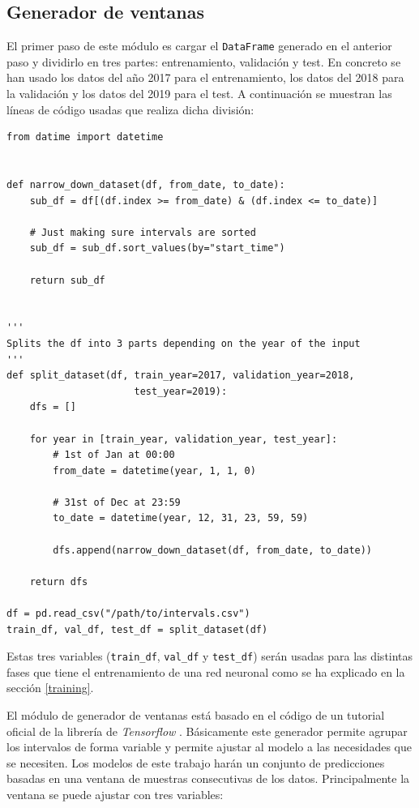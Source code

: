 \subsection{Generador de ventanas}\label{window-generator}

El primer paso de este módulo es cargar el \small{\verb|DataFrame|} generado en el anterior paso y dividirlo en tres partes: entrenamiento, validación y test. En concreto se han usado los datos del año 2017 para el entrenamiento, los datos del 2018 para la validación y los datos del 2019 para el test. A continuación se muestran las líneas de código usadas que realiza dicha división:
\begin{verbatim}
from datime import datetime


def narrow_down_dataset(df, from_date, to_date):
    sub_df = df[(df.index >= from_date) & (df.index <= to_date)]
    
    # Just making sure intervals are sorted
    sub_df = sub_df.sort_values(by="start_time") 
    
    return sub_df


'''
Splits the df into 3 parts depending on the year of the input
'''
def split_dataset(df, train_year=2017, validation_year=2018,
                      test_year=2019):
    dfs = []
    
    for year in [train_year, validation_year, test_year]:
        # 1st of Jan at 00:00
        from_date = datetime(year, 1, 1, 0)           
        
        # 31st of Dec at 23:59
        to_date = datetime(year, 12, 31, 23, 59, 59)
        
        dfs.append(narrow_down_dataset(df, from_date, to_date))

    return dfs
    
df = pd.read_csv("/path/to/intervals.csv")
train_df, val_df, test_df = split_dataset(df)
\end{verbatim}
Estas tres variables (\small\verb|train_df|, \small\verb|val_df| y \small\verb|test_df|) serán usadas para las distintas fases que tiene el entrenamiento de una red neuronal como se ha explicado en la sección \ref{training}.
\newline

El módulo de generador de ventanas está basado en el código de un tutorial oficial de la librería de \textit{Tensorflow} \cite{windowgenerator}. Básicamente este generador permite agrupar los intervalos de forma variable y permite ajustar al modelo a las necesidades que se necesiten. Los modelos de este trabajo harán un conjunto de predicciones basadas en una ventana de muestras consecutivas de los datos. Principalmente la ventana se puede ajustar con tres variables:

